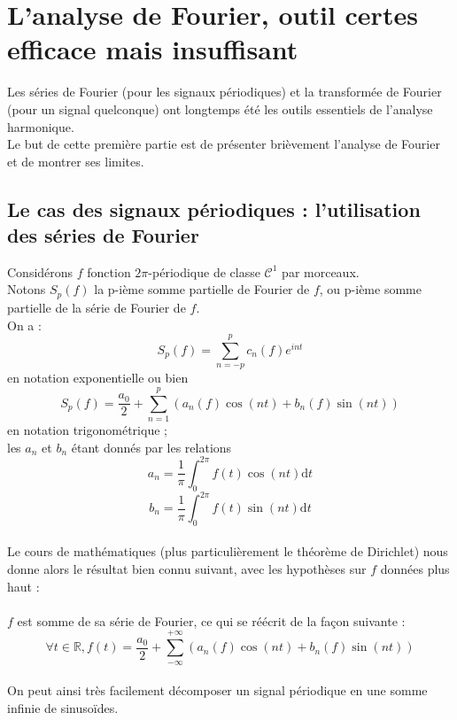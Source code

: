 

\section{L'analyse de Fourier, outil certes efficace mais insuffisant}

Les séries de Fourier (pour les signaux périodiques) et la transformée de Fourier (pour un signal quelconque) ont longtemps été les outils essentiels de l'analyse harmonique. \\
Le but de cette première partie est de présenter brièvement l'analyse de Fourier et de montrer ses limites.

\subsection{Le cas des signaux périodiques : l'utilisation des séries de Fourier}

Considérons $f$ fonction $2\pi$-périodique de classe $\mathcal{C}^{1}$ par morceaux. \\
Notons $S_{p}(f)$ la p-ième somme partielle de Fourier de $f$, ou p-ième somme partielle de la série de Fourier de $f$. \\
On a : $$ S_{p}(f)=\sum_{n=-p}^{p}c_{n}(f)e^{int} $$ en notation exponentielle ou bien $$ S_{p}(f)=\displaystyle\frac{a_{0}}{2}+\sum_{n=1}^{p}\left(a_{n}(f)\cos(nt)+b_{n}(f)\sin(nt)\right)$$ en notation trigonométrique ; \\
les $a_n$ et $b_n$ étant donnés par les relations 
$$ a_n=\displaystyle\frac{1}{\pi}\int_{0}^{2\pi}f(t)\cos(nt)\mathrm{d}t$$
$$ b_n=\displaystyle\frac{1}{\pi}\int_{0}^{2\pi}f(t)\sin(nt)\mathrm{d}t$$
\\
Le cours de mathématiques (plus particulièrement le théorème de Dirichlet) nous donne alors le résultat bien connu suivant, avec les hypothèses sur $f$ données plus haut : \\
\\
$f$ est somme de sa série de Fourier, ce qui se réécrit de la façon suivante :
$$\forall t\in\mathbb{R}, f(t)=\displaystyle\frac{a_{0}}{2}+\sum_{-\infty}^{+\infty}\left(a_{n}(f)\cos(nt)+b_{n}(f)\sin(nt)\right)$$
\\
On peut ainsi très facilement décomposer un signal périodique en une somme infinie de sinusoïdes. 

\pagebreak

